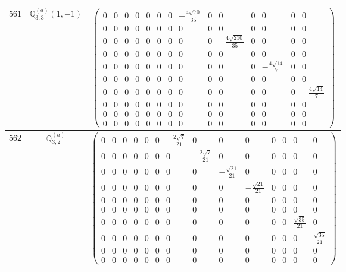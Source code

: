 \documentclass[fleqn,8pt,landscape]{jsarticle}
\begin{document}
\begin{center}
\begin{longtable}{ccc}
$ 561 $ & $ \mathbb{Q}_{3,3}^{(a)}(1,-1) $ & $ \begin{pmatrix} 0 & 0 & 0 & 0 & 0 & 0 & 0 & - \frac{4 \sqrt{70}}{35} & 0 & 0 & 0 & 0 & 0 & 0 \\ 0 & 0 & 0 & 0 & 0 & 0 & 0 & 0 & 0 & 0 & 0 & 0 & 0 & 0 \\ 0 & 0 & 0 & 0 & 0 & 0 & 0 & 0 & 0 & - \frac{4 \sqrt{210}}{35} & 0 & 0 & 0 & 0 \\ 0 & 0 & 0 & 0 & 0 & 0 & 0 & 0 & 0 & 0 & 0 & 0 & 0 & 0 \\ 0 & 0 & 0 & 0 & 0 & 0 & 0 & 0 & 0 & 0 & 0 & - \frac{4 \sqrt{14}}{7} & 0 & 0 \\ 0 & 0 & 0 & 0 & 0 & 0 & 0 & 0 & 0 & 0 & 0 & 0 & 0 & 0 \\ 0 & 0 & 0 & 0 & 0 & 0 & 0 & 0 & 0 & 0 & 0 & 0 & 0 & - \frac{4 \sqrt{14}}{7} \\ 0 & 0 & 0 & 0 & 0 & 0 & 0 & 0 & 0 & 0 & 0 & 0 & 0 & 0 \\ 0 & 0 & 0 & 0 & 0 & 0 & 0 & 0 & 0 & 0 & 0 & 0 & 0 & 0 \\ 0 & 0 & 0 & 0 & 0 & 0 & 0 & 0 & 0 & 0 & 0 & 0 & 0 & 0 \end{pmatrix} $ \\ \hline
$ 562 $ & $ \mathbb{Q}_{3,2}^{(a)} $ & $ \begin{pmatrix} 0 & 0 & 0 & 0 & 0 & 0 & - \frac{2 \sqrt{7}}{21} & 0 & 0 & 0 & 0 & 0 & 0 & 0 \\ 0 & 0 & 0 & 0 & 0 & 0 & 0 & - \frac{2 \sqrt{7}}{21} & 0 & 0 & 0 & 0 & 0 & 0 \\ 0 & 0 & 0 & 0 & 0 & 0 & 0 & 0 & - \frac{\sqrt{21}}{21} & 0 & 0 & 0 & 0 & 0 \\ 0 & 0 & 0 & 0 & 0 & 0 & 0 & 0 & 0 & - \frac{\sqrt{21}}{21} & 0 & 0 & 0 & 0 \\ 0 & 0 & 0 & 0 & 0 & 0 & 0 & 0 & 0 & 0 & 0 & 0 & 0 & 0 \\ 0 & 0 & 0 & 0 & 0 & 0 & 0 & 0 & 0 & 0 & 0 & 0 & 0 & 0 \\ 0 & 0 & 0 & 0 & 0 & 0 & 0 & 0 & 0 & 0 & 0 & 0 & \frac{\sqrt{35}}{21} & 0 \\ 0 & 0 & 0 & 0 & 0 & 0 & 0 & 0 & 0 & 0 & 0 & 0 & 0 & \frac{\sqrt{35}}{21} \\ 0 & 0 & 0 & 0 & 0 & 0 & 0 & 0 & 0 & 0 & 0 & 0 & 0 & 0 \\ 0 & 0 & 0 & 0 & 0 & 0 & 0 & 0 & 0 & 0 & 0 & 0 & 0 & 0 \end{pmatrix} $ \\ \hline

\end{longtable}
\end{center}
\end{document}
